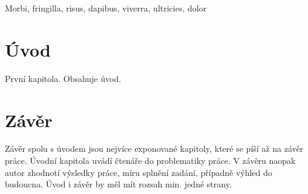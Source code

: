 \documentclass[11pt,a4paper,fleqn,titlepage,twoside,openany]{book}
\begin{document}
Morbi, fringilla, risus, dapibus, viverra, ultricies, dolor

\tableofcontents
\thispagestyle{empty}

\chapter {Úvod}
První kapitola. Obsahuje úvod.



\chapter{Závěr}

Závěr spolu s úvodem jsou nejvíce exponované kapitoly, které se píší až na závěr práce. Úvodní kapitola uvádí čtenáře do problematiky práce. V závěru naopak autor zhodnotí výsledky práce, míru splnění zadání, případně výhled do budoucna. Úvod i závěr by měl mít rozsah min. jedné strany.
\end{document}
